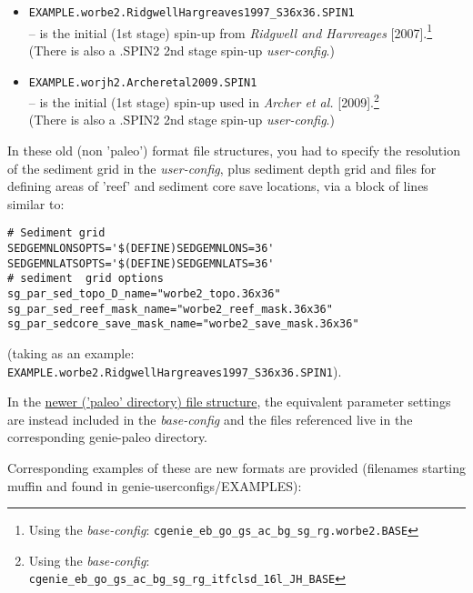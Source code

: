 \begin{enumerate}[noitemsep]
\begin{itemize}[noitemsep]
\vspace{1mm}
\item \texttt{EXAMPLE.worbe2.RidgwellHargreaves1997\_S36x36.SPIN1}
\\-- is the initial (1st stage) spin-up from \textit{Ridgwell and Harvreages} [2007].\footnote{Using the \textit{base-config}: \texttt{cgenie\_eb\_go\_gs\_ac\_bg\_sg\_rg.worbe2.BASE}}
\\(There is also a \textsf{\footnotesize *.SPIN2} 2nd stage spin-up \textit{user-config}.)
\vspace{1mm}
\item \texttt{EXAMPLE.worjh2.Archeretal2009.SPIN1}
\\-- is the initial (1st stage) spin-up used in \textit{Archer et al.} [2009].\footnote{Using the \textit{base-config}: \texttt{cgenie\_eb\_go\_gs\_ac\_bg\_sg\_rg\_itfclsd\_16l\_JH\_BASE}}
\\(There is also a \textsf{\footnotesize *.SPIN2} 2nd stage spin-up \textit{user-config}.)
\end{itemize}

\vspace{2mm}
In these old (non 'paleo') format file structures, you had to specify the resolution of the sediment grid in the \textit{user-config}, plus sediment depth grid and files for defining areas of 'reef' and sediment core save locations, via a block of lines similar to:
\vspace{-1mm}\small\begin{verbatim}
# Sediment grid
SEDGEMNLONSOPTS='$(DEFINE)SEDGEMNLONS=36'
SEDGEMNLATSOPTS='$(DEFINE)SEDGEMNLATS=36'
# sediment  grid options
sg_par_sed_topo_D_name="worbe2_topo.36x36"
sg_par_sed_reef_mask_name="worbe2_reef_mask.36x36"
sg_par_sedcore_save_mask_name="worbe2_save_mask.36x36"
\end{verbatim}\normalsize\vspace{-1mm}
(taking as an example: \texttt{EXAMPLE.worbe2.RidgwellHargreaves1997\_S36x36.SPIN1}).

\vspace{1mm}
In the \uline{newer ('paleo' directory) file structure}, the equivalent parameter settings are instead included in the \textit{base-config} and the files referenced live in the corresponding \textsf{\footnotesize genie-paleo} directory.

Corresponding examples of these are new formats are provided (filenames starting \textsf{\footnotesize muffin} and found in \textsf{\footnotesize genie-userconfigs/EXAMPLES}):


\end{enumerate}
